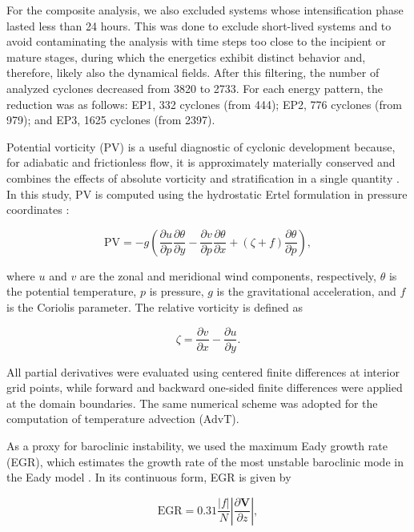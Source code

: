 \documentclass[pdflatex,sn-chicago]{sn-jnl}%
\theoremstyle{plain}
\theoremstyle{definition}
\theoremstyle{remark}
\theoremstyle{definition}
\begin{document}
For the composite analysis, we also excluded systems whose intensification phase lasted less than 24 hours. This was done to exclude short-lived systems and to avoid contaminating the analysis with time steps too close to the incipient or mature stages, during which the energetics exhibit distinct behavior \citep{de2025lorenz} and, therefore, likely also the dynamical fields. After this filtering, the number of analyzed cyclones decreased from 3820 to 2733. For each energy pattern, the reduction was as follows: EP1, 332 cyclones (from 444); EP2, 776 cyclones (from 979); and EP3, 1625 cyclones (from 2397).


Potential vorticity (PV) is a useful diagnostic of cyclonic development because, for adiabatic and frictionless flow, it is approximately materially conserved and combines the effects of absolute vorticity and stratification in a single quantity \citep{hoskins1985use}. In this study, PV is computed using the hydrostatic Ertel formulation in pressure coordinates \citep{bluestein1993observations}:

\begin{equation}
\mathrm{PV}
=
-g\left(
\frac{\partial u}{\partial p}\frac{\partial \theta}{\partial y}
-
\frac{\partial v}{\partial p}\frac{\partial \theta}{\partial x}
+
(\zeta + f)\frac{\partial \theta}{\partial p}
\right),
\end{equation}

where \(u\) and \(v\) are the zonal and meridional wind components, respectively, \(\theta\) is the potential temperature, \(p\) is pressure, \(g\) is the gravitational acceleration, and \(f\) is the Coriolis parameter. The relative vorticity is defined as

\begin{equation}
\zeta = \frac{\partial v}{\partial x} - \frac{\partial u}{\partial y}.
\end{equation}

All partial derivatives were evaluated using centered finite differences at interior grid points, while forward and backward one-sided finite differences were applied at the domain boundaries. The same numerical scheme was adopted for the computation of temperature advection (AdvT).

As a proxy for baroclinic instability, we used the maximum Eady growth rate (EGR), which estimates the growth rate of the most unstable baroclinic mode in the Eady model \citep{eady1949long,lindzen1980simple}. In its continuous form, EGR is given by

\begin{equation}
\mathrm{EGR} = 0.31 \frac{|f|}{N} \left| \frac{\partial \mathbf{V}}{\partial z} \right|,
\end{equation}
\end{document}
